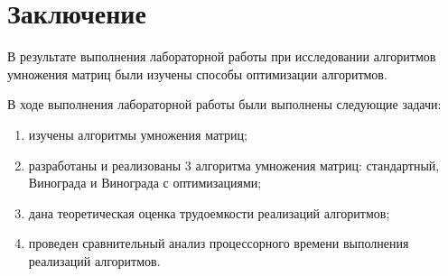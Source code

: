 \chapter*{Заключение}

В результате выполнения лабораторной работы при исследовании алгоритмов умножения матриц были изучены способы оптимизации алгоритмов.

В ходе выполнения лабораторной работы были выполнены следующие задачи: 
\begin{enumerate}[label={\arabic*)}]
	\item изучены алгоритмы умножения матриц;
\item разработаны и реализованы 3 алгоритма умножения матриц: стандартный, Винограда и Винограда с оптимизациями;
\item дана теоретическая оценка трудоемкости реализаций алгоритмов;
\item проведен сравнительный анализ процессорного времени выполнения реализаций алгоритмов.
\end{enumerate}

